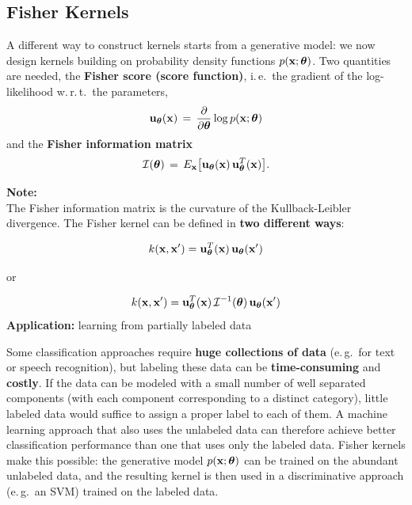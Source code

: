 \subsection{Fisher Kernels}
	A different way to construct kernels starts from a generative model: we now design kernels building on probability density functions $p(\bm{\mathrm{x}};\bm{\mathrm{\theta}})$. Two quantities are needed, the \textbf{Fisher score (score function)}, i.\,e.\ the gradient of the log-likelihood w.\,r.\,t.\ the parameters,
		      \begin{displaymath}
			      \bm{\mathrm{u}}_{\bm{\mathrm{\theta}}}(\bm{\mathrm{x}}) \,=\, \frac{\partial}{\partial \bm{\mathrm{\theta}}} \log p(\bm{\mathrm{x}}; \bm{\mathrm{\theta}})
		      \end{displaymath}
	and the \textbf{Fisher information matrix}
		      \begin{displaymath}
			      \mathcal I(\bm{\mathrm{\theta}}) \,=\, E_{\bm{\mathrm{x}}} \big[\bm{\mathrm{u}}_{\bm{\mathrm{\theta}}}(\bm{\mathrm{x}})\, \bm{\mathrm{u}}_{\bm{\mathrm{\theta}}}^T(\bm{\mathrm{x}})\big].
		      \end{displaymath}

	\textbf {Note:} \\
	The Fisher information matrix is the curvature of the Kullback-Leibler divergence. The Fisher kernel can be defined in   \textbf{two different ways}:

	\begin{displaymath}
		k(\bm{\mathrm{x}}, \bm{\mathrm{x}}') = \bm{\mathrm{u}}_{\bm{\mathrm{\theta}}}^T(\bm{\mathrm{x}})\, \bm{\mathrm{u}}_{\bm{\mathrm{\theta}}}(\bm{\mathrm{x}}')
	\end{displaymath}

	or

	\begin{displaymath}
		k(\bm{\mathrm{x}}, \bm{\mathrm{x}}') =  \bm{\mathrm{u}}_{\bm{\mathrm{\theta}}}^T(\bm{\mathrm{x}})\, \mathcal I ^{-1}(\bm{\mathrm{\theta}})\, \bm{\mathrm{u}}_{\bm{\mathrm{\theta}}}(\bm{\mathrm{x}}')
	\end{displaymath}
	\textbf {Application:} learning from partially labeled data  

	\small
	Some classification approaches require \textbf{huge collections of data} (e.\,g.\ for text or speech recognition), but labeling these data can be \textbf{time-consuming} and \textbf{costly}. If the data can be modeled with a small number of well separated components (with each component corresponding to a distinct category), little labeled data would suffice to assign a proper label to each of them. A machine learning approach that also uses the unlabeled data can therefore achieve better classification performance than one that uses only the labeled data. Fisher kernels make this possible: the generative model $p(\bm{\mathrm{x}};\bm{\mathrm{\theta}})$ can be trained on the abundant unlabeled data, and the resulting kernel is then used in a discriminative approach (e.\,g.\ an SVM) trained on the labeled data.
  
